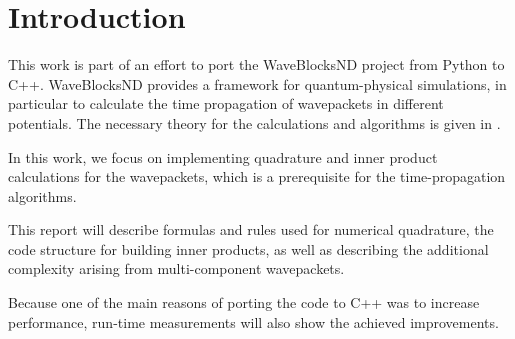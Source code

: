 \section{Introduction}

This work is part of an effort to port the WaveBlocksND project
\cite{waveblocksnd} from Python to C++.
WaveBlocksND provides a framework for quantum-physical simulations, in
particular to calculate the time propagation of wavepackets in different
potentials.
The necessary theory for the calculations and algorithms is given in
\cite{B_master_thesis}.

In this work, we focus on implementing quadrature and inner product calculations
for the wavepackets, which is a prerequisite for the time-propagation
algorithms.

This report will describe formulas and rules used for numerical quadrature,
the code structure for building inner products, as well as describing the
additional complexity arising from multi-component wavepackets.

Because one of the main reasons of porting the code to C++ was to increase
performance, run-time measurements will also show the achieved improvements.
